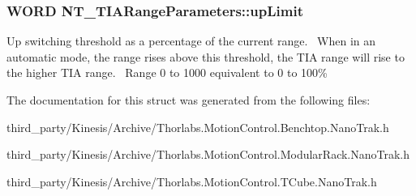 \subsubsection[{\texorpdfstring{up\+Limit}{upLimit}}]{\setlength{\rightskip}{0pt plus 5cm}W\+O\+RD N\+T\+\_\+\+T\+I\+A\+Range\+Parameters\+::up\+Limit}\hypertarget{struct_n_t___t_i_a_range_parameters_a7982ed805a6dc128de98b5685f748bbc}{}\label{struct_n_t___t_i_a_range_parameters_a7982ed805a6dc128de98b5685f748bbc}


Up switching threshold as a percentage of the current range.~\newline
 When in an automatic mode, the range rises above this threshold, the T\+IA range will rise to the higher T\+IA range.~\newline
 Range 0 to 1000 equivalent to 0 to 100\% 



The documentation for this struct was generated from the following files\+:\begin{DoxyCompactItemize}
\item 
third\+\_\+party/\+Kinesis/\+Archive/Thorlabs.\+Motion\+Control.\+Benchtop.\+Nano\+Trak.\+h\item 
third\+\_\+party/\+Kinesis/\+Archive/Thorlabs.\+Motion\+Control.\+Modular\+Rack.\+Nano\+Trak.\+h\item 
third\+\_\+party/\+Kinesis/\+Archive/Thorlabs.\+Motion\+Control.\+T\+Cube.\+Nano\+Trak.\+h\end{DoxyCompactItemize}

